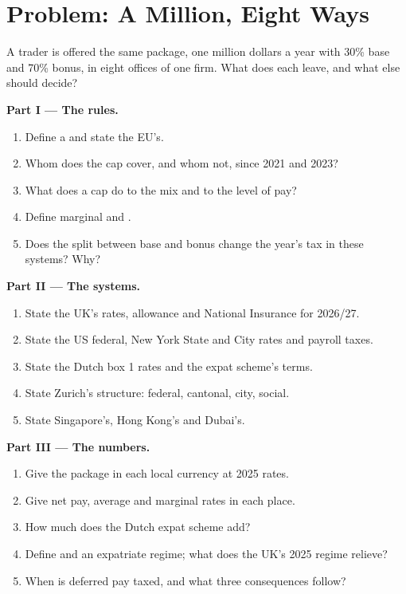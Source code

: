 \section{Problem: A Million, Eight Ways}

\begin{problem}\label{pb:in:pay-regulation-and-tax-by-location:1}
A trader is offered the same package, one million dollars a year with 30\% base and 70\% bonus, in eight offices of one
firm. What does each leave, and what else should decide?

\medskip\noindent\textbf{Part I --- The rules.}
\begin{enumerate}
\item Define a  and state the EU's.
\item Whom does the cap cover, and whom not, since 2021 and 2023?
\item What does a cap do to the mix and to the level of pay?
\item Define marginal and .
\item Does the split between base and bonus change the year's tax in these systems? Why?
\end{enumerate}

\medskip\noindent\textbf{Part II --- The systems.}
\begin{enumerate}[resume]
\item State the UK's rates, allowance and National Insurance for 2026/27.
\item State the US federal, New York State and City rates and payroll taxes.
\item State the Dutch box 1 rates and the expat scheme's terms.
\item State Zurich's structure: federal, cantonal, city, social.
\item State Singapore's, Hong Kong's and Dubai's.
\end{enumerate}

\medskip\noindent\textbf{Part III --- The numbers.}
\begin{enumerate}[resume]
\item Give the package in each local currency at 2025 rates.
\item Give net pay, average and marginal rates in each place.
\item How much does the Dutch expat scheme add?
\item Define  and an expatriate regime; what does the UK's 2025 regime relieve?
\item When is deferred pay taxed, and what three consequences follow?
\end{enumerate}


\end{problem}
